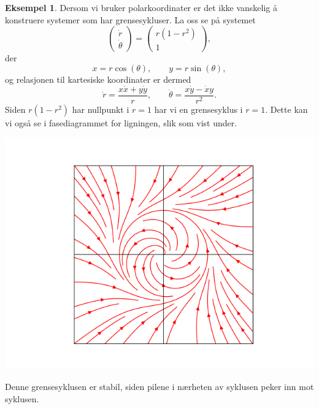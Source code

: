 \documentclass{article}
\theoremstyle{plain}
\theoremstyle{definition}
\newtheorem{eksempel}[teorem]{Eksempel}
\theoremstyle{remark}
\begin{document}
\begin{eksempel}
    Dersom vi bruker polarkoordinater er det ikke vanskelig å konstruere systemer som har grensesykluser. La oss se på systemet
    \begin{equation*}
        \begin{pmatrix}
            \dot{r} \\
            \dot{\theta}
        \end{pmatrix}
        =
        \begin{pmatrix}
            r(1-r^2) \\
            1
        \end{pmatrix},
    \end{equation*} 
    der
    \begin{equation*}
        x = r \cos(\theta), \qquad y = r \sin(\theta),
    \end{equation*}
    og relasjonen til kartesiske koordinater er dermed
    \begin{equation*}
        \dot{r} = \frac{x\dot{x} + y \dot{y}}{r}, \qquad \dot{\theta} = \frac{x\dot{y} - \dot{x}y}{r^2}.
    \end{equation*}
    Siden $r(1-r^2)$ har nullpunkt i $r = 1$ har vi en grensesyklus i $r = 1$. Dette kan vi også se i fasediagrammet for ligningen, slik som vist under.
    \begin{center}
        \includegraphics[scale=0.5]{phase_plane_radial.png}
    \end{center}
    Denne grensesyklusen er stabil, siden pilene i nærheten av syklusen peker inn mot syklusen.
\end{eksempel}
\end{document}
